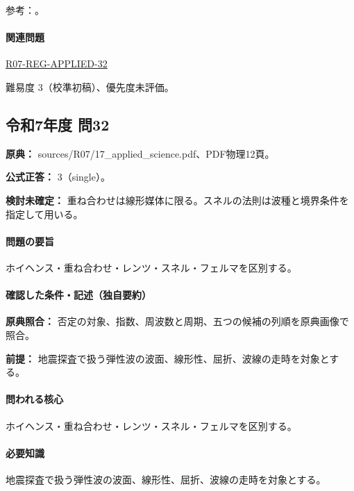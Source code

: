 \par 参考：\cite{usgs_equivalent2007,stanford_downward2001,mit_signals2010}。

\paragraph{関連問題} \hyperref[q:r07-reg-applied-32]{R07-REG-APPLIED-32}

\par 難易度 3（校準初稿）、優先度未評価。

\subsection{令和7年度 問32}
\label{q:r07-reg-applied-32}

\noindent\textbf{原典：} sources/R07/17\_applied\_science.pdf、PDF物理12頁。

\textbf{公式正答：} 3（single）。

\par\textbf{検討未確定：} 重ね合わせは線形媒体に限る。スネルの法則は波種と境界条件を指定して用いる。

\paragraph{問題の要旨} ホイヘンス・重ね合わせ・レンツ・スネル・フェルマを区別する。

\paragraph{確認した条件・記述（独自要約）}\mbox{}\par

\noindent\textbf{原典照合：} 否定の対象、指数、周波数と周期、五つの候補の列順を原典画像で照合。\par

\noindent\textbf{前提：} 地震探査で扱う弾性波の波面、線形性、屈折、波線の走時を対象とする。\par

\paragraph{問われる核心} ホイヘンス・重ね合わせ・レンツ・スネル・フェルマを区別する。

\paragraph{必要知識} 地震探査で扱う弾性波の波面、線形性、屈折、波線の走時を対象とする。

